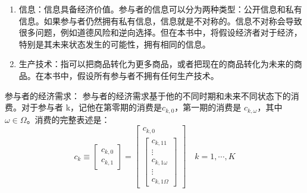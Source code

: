 \begin{tcolorbox}[knowledge,title=2.2 经济参与者]
\begin{enumerate}
    在数学上，可以把参与者的禀赋看成是 $1+\Omega$ 维实空间 $\mathrm{R}^{1+\Omega}$ 中的一个元素，且假设参与者的禀赋非负，那么禀赋 $e_k \in \mathrm{R}^{1+\Omega}_{+}$。
\begin{tcolorbox}[warning,title=向量的“大于”]
    对于向量 $a=\begin{bmatrix}a_1 \\ a_2 \\ \vdots \\ a_n\end{bmatrix}$，有以下定义：
    \begin{enumerate}
        \item $a \ge 0$，即 a 的所有分量都非负，即 $a_i \ge 0, i=1,\cdots,n$。
        \item $a > 0$，即 a 的所有分量都非负，且至少有一个分量严格大于 0，即 $\exists i \in \{1,\cdots,n\}$ 使得 $a_i > 0$。
        \item $a \gg 0$，即 a 的所有分量都严格大于零，即 $a_i > 0, i \in \{1,\cdots,n\}$。
    \end{enumerate}
\end{tcolorbox}
    \item 信息：信息具备经济价值。参与者的信息可以分为两种类型：公开信息和私有信息。如果参与者仍然拥有私有信息，信息就是不对称的。信息不对称会导致很多问题，例如道德风险和逆向选择。但在本书中，将假设经济者对于经济，特别是其未来状态发生的可能性，拥有相同的信息。
    \item 生产技术：指可以把商品转化为更多商品，或者把现在的商品转化为未来的商品。在本书中，假设所有参与者不拥有任何生产技术。
\end{enumerate}

\tcbline

参与者的经济需求：
参与者的经济需求基于他的不同时期和未来不同状态下的消费。对于参与者 k，记他在第零期的消费是$c_{k,0}$，第一期的消费是 $c_{k,\omega}$，其中 $\omega \in \Omega$。消费的完整表述是：
\[
c_k \equiv \begin{bmatrix}c_{k,0} \\ c_{k,1}\end{bmatrix}=
\begin{bmatrix}c_{k,0} \\ \begin{bmatrix}c_{k,11} \\ \vdots \\ c_{k,1\omega} \\ \vdots \\ c_{k,1\Omega}\end{bmatrix}
\end{bmatrix} \quad k=1,\cdots,K
\]



\end{tcolorbox}
